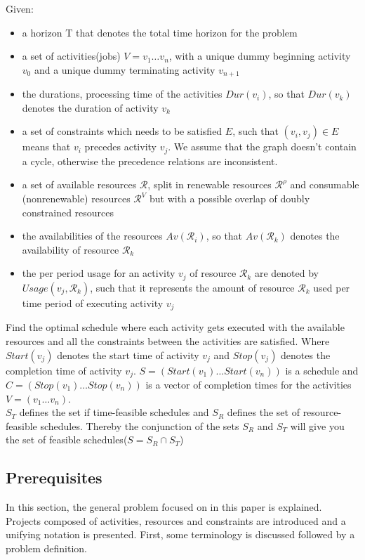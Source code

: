 \documentclass{article}
\begin{document}
Given:
\begin{itemize}
\item a horizon T that denotes the total time horizon for the problem
\item a set of activities(jobs) $V = v_1 \ldots v_n$, with a unique dummy beginning activity $v_0$ and a unique dummy terminating activity $v_{n+1}$
\item the durations, processing time of the activities $Dur(v_i)$, so that $Dur(v_k)$ denotes the duration of activity $v_k$
\item a set of constraints which needs to be satisfied $E$, such that $(v_i,v_j) \in E$ means that $v_i$ precedes activity $v_j$. We assume that the graph doesn't contain a cycle, otherwise the precedence relations are inconsistent.
\item a set of available resources $\mathcal{R}$, split in renewable resources $\mathcal{R}^{\rho}$ and  consumable (nonrenewable) resources $\mathcal{R}^V$ but with a possible overlap of doubly constrained resources
\item the availabilities of the resources $Av(\mathcal{R}_i)$, so that $Av(\mathcal{R}_k)$ denotes the availability of resource $\mathcal{R}_k$
\item the per period usage for an activity $v_j$ of resource $\mathcal{R}_k$ are denoted by $Usage(v_j, \mathcal{R}_k)$, such that it represents the amount of resource $\mathcal{R}_k$ used per time period of executing activity $v_j$
\end{itemize}

Find the optimal schedule where each activity gets executed with the available resources and all the constraints between the activities are satisfied. Where $Start(v_j)$ denotes the start time of activity $v_j$ and $Stop(v_j)$ denotes the completion time of activity $v_j$. $S = (Start(v_1) \ldots Start(v_n))$ is a schedule and $C = (Stop(v_1) \ldots Stop(v_n))$ is a vector of completion times for the activities $V = (v_1 \ldots v_n)$. \\
$S_T$ defines the set if time-feasible schedules and $S_R$ defines the set of resource-feasible schedules. Thereby the conjunction of the sets $S_R$ and $S_T$ will give you the set of feasible schedules($S = S_R \cap S_T$)

\subsection{Prerequisites}
In this section, the general problem focused on in this paper is explained. Projects composed of activities, resources and constraints are introduced and a unifying notation is presented. First, some terminology is discussed followed by a problem definition.
\end{document}
